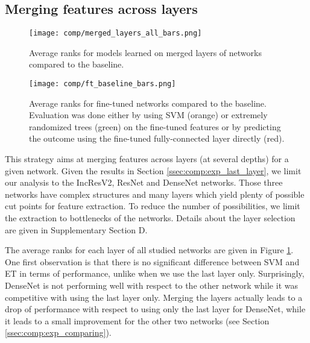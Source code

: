 \subsection{Merging features across layers}
\label{ssec:comp:exp_merged_layers}

\begin{figure}
     \center 
     \texttt{[image: comp/merged\_layers\_all\_bars.png]}
     \caption{Average ranks for models learned on merged layers of networks compared to the baseline.}
     \label{fig:comp:res_avg_ranks_merged_layers}
 \end{figure}
 

 
  \begin{figure}
     \center 
     \texttt{[image: comp/ft\_baseline\_bars.png]}
     \caption{Average ranks for fine-tuned networks compared to the baseline. Evaluation was done either by using SVM (orange) or extremely randomized trees (green) on the fine-tuned features or by predicting the outcome using the fine-tuned fully-connected layer directly (red).}
     \label{fig:comp:res_avg_ranks_ft}
 \end{figure}

This strategy aims at merging features across layers (at several depths) for a given network. Given the results in Section \ref{ssec:comp:exp_last_layer}, we limit our analysis to the IncResV2, ResNet and DenseNet networks. Those three networks have complex structures and many layers which yield plenty of possible cut points for feature extraction. To reduce the number of possibilities, we limit the extraction to bottlenecks of the networks. Details about the layer selection are given in Supplementary Section D. 

The average ranks for each layer of all studied networks are given in Figure \ref{fig:comp:res_avg_ranks_merged_layers}. One first observation is that there is no significant difference between SVM and ET in terms of performance, unlike when we use the last layer only. Surprisingly, DenseNet is not performing well with respect to the other network while it was competitive with using the last layer only. Merging the layers actually leads to a drop of performance with respect to using only the last layer for DenseNet, while it leads to a small improvement for the other two networks (see Section \ref{ssec:comp:exp_comparing}).

